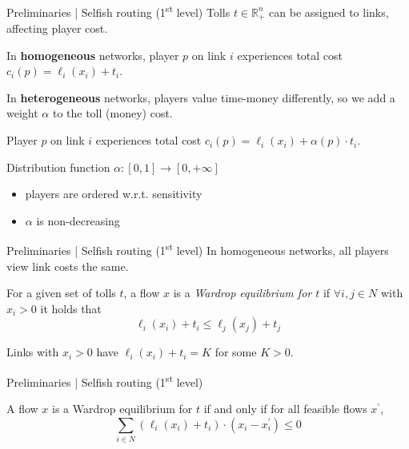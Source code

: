 \documentclass{beamer}
\newcommand{\R}{\mathbb{R}}
\begin{document}
\begin{frame}{Preliminaries | Selfish routing (1\textsuperscript{st} level)}
	Tolls $t \in \R_+^n$ can be assigned to links, affecting player cost.

	In \textbf{homogeneous} networks, player $p$ on link $i$ experiences total cost $c_i(p) = \ell_i(x_i) + t_i$.

	In \textbf{heterogeneous} networks, players value time-money differently, so we add a weight $\alpha$ to the toll (money) cost.

	Player $p$ on link $i$ experiences total cost $c_i(p) = \ell_i(x_i) + \alpha(p) \cdot t_i$.
	\begin{block}{Distribution function $\alpha: [0, 1] \rightarrow [0, +\infty]$}
		\begin{itemize}
			\item players are ordered w.r.t. sensitivity
			\item $\alpha$ is non-decreasing
		\end{itemize}
	\end{block}
\end{frame}

\begin{frame}{Preliminaries | Selfish routing (1\textsuperscript{st} level)}
	In homogeneous networks, all players view link costs the same.
	\begin{definition}
		For a given set of tolls $t$, a flow $x$ is a \textit{Wardrop equilibrium for $t$} if $\forall i, j \in N$ with $x_i > 0$ it holds that
		\begin{equation*}
			\ell_i(x_i) + t_i \leq \ell_j(x_j) + t_j
		\end{equation*}
	\end{definition}
	Links with $x_i > 0$ have $\ell_i(x_i) + t_i = K$ for some $K > 0$.

\end{frame}

\begin{frame}{Preliminaries | Selfish routing (1\textsuperscript{st} level)}
	\begin{lemma}
		A flow $x$ is a Wardrop equilibrium for $t$ if and only if for all feasible flows $x^\prime$,
		\[\sum_{i \in N} (\ell_i(x_i) + t_i) \cdot (x_i - x_i^\prime) \leq 0\]
	\end{lemma}
\end{frame}
\end{document}
